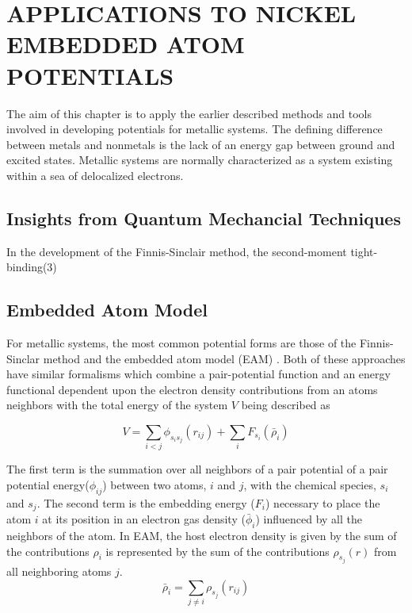 \chapter{APPLICATIONS TO NICKEL EMBEDDED ATOM POTENTIALS}

The aim of this chapter is to apply the earlier described methods and tools involved in developing potentials for metallic systems.  The defining difference between metals and nonmetals is the lack of an energy gap between ground and excited states.  Metallic systems are normally characterized as a system existing within a sea of delocalized electrons.

\section{Insights from Quantum Mechancial Techniques}

In the development of the Finnis-Sinclair method, the second-moment tight-binding(3)

\section{Embedded Atom Model}

For metallic systems, the most common potential forms are those of the Finnis-Sinclar method\cite{finnis1984_fs} and the embedded atom model (EAM) \cite{daw1983_eam,daw1984_eam}.
Both of these approaches have similar formalisms which combine a pair-potential function and an energy functional dependent upon the electron density contributions from an atoms neighbors with the total energy of the system $V$ being described as

\begin{equation}
  V=\sum_{i<j}\phi_{s_i s_j}(r_{ij})
	+\sum_{i}F_{s_i}(\bar{\rho}_{i})
\end{equation}

The first term is the summation over all neighbors of a pair potential of a pair potential energy($\phi_{ij}$) between two atoms, $i$ and $j$, with the chemical species, $s_i$ and $s_j$.
The second term is the embedding energy ($F_i$) necessary to place the atom $i$ at its position in an electron gas density ($\bar{\phi}_i$) influenced by all the neighbors of the atom.
In EAM, the host electron density is given by the sum of the contributions $\rho_i$ is represented by the sum of the contributions $\rho_{s_j}(r)$ from all neighboring atoms $j$.
\begin{equation}
	\bar{\rho}_i = \sum_{j \neq i} \rho_{s_j}(r_{ij})
\end{equation}

